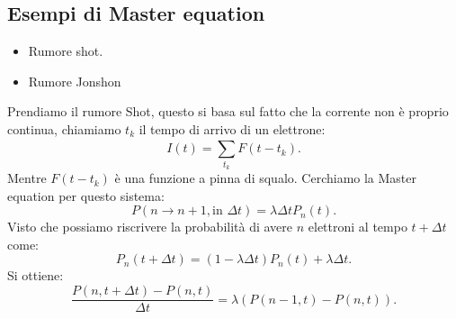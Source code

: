 \subsection{Esempi di Master equation}%
\begin{itemize}
    \item Rumore shot.
    \item Rumore Jonshon
\end{itemize}
Prendiamo il rumore Shot, questo si basa sul fatto che la corrente non è proprio continua, chiamiamo $t_k$ il tempo di arrivo di un elettrone:
\[
    I(t) = \sum_{t_k}^{} F(t-t_k) 
.\] 
Mentre $F(t-t_k)$ è una funzione a pinna di squalo. Cerchiamo la Master equation per questo sistema:
\[
    P(n\to n+1, \text{in }\Delta  t) = \lambda \Delta tP_n(t) 
.\] 
Visto che possiamo riscrivere la probabilità di avere $n$ elettroni al tempo $t+\Delta t$ come: 
\[
    P_n(t+\Delta  t) = \left(1-\lambda\Delta t\right)P_n(t) + \lambda\Delta t 
.\] 
Si ottiene:
\[
    \frac{P(n, t+\Delta  t) - P(n,t)}{\Delta t} = \lambda (P(n-1,t) -P(n,t)) 
.\] 
